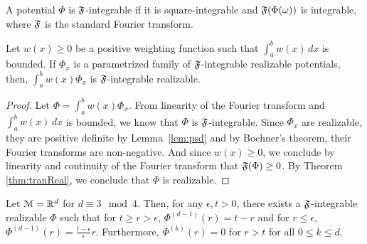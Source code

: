 \begin{definition}
A potential $\Phi$ is ${\mathfrak{F}}$-integrable if it is square-integrable and ${\mathfrak{F}}({\Phi}(\omega))$ is integrable, where ${\mathfrak{F}}$ is the standard Fourier transform.
\end{definition}

\begin{lemma}\label{intReal}
Let $w(x) \geq 0$ be a positive weighting function such that $\int_a^b w(x) \, dx$ is bounded. If $\Phi_x$ is a parametrized family of ${\mathfrak{F}}$-integrable realizable potentials, then, $\int_a^b w(x) \Phi_x$ is ${\mathfrak{F}}$-integrable realizable.
\end{lemma}

\begin{proof}
Let $\Phi = \int_a^b w(x) \Phi_x$. From linearity of the Fourier transform and $\int_a^b w(x)\, dx$ is bounded, we know that $\Phi$ is ${\mathfrak{F}}$-integrable. Since $\Phi_x$ are realizable, they are positive definite by Lemma~\ref{lem:psd} and by Bochner's theorem, their Fourier transforms are non-negative. And since $w(x) \geq 0$, we conclude by linearity and continuity of the Fourier transform that ${\mathfrak{F}}(\Phi) \geq 0$. By Theorem \ref{thm:tranReal}, we conclude that $\Phi$ is realizable.
\end{proof}



\begin{lemma}\label{baseConstruct}
Let $\mathcal{M} = {\mathbb{R}}^d$ for $d \equiv 3 \mod 4$. Then, for any $\epsilon, t > 0$, there exists a ${\mathfrak{F}}$-integrable realizable $\Phi$ such that for $t \geq r > \epsilon$, $\Phi^{(d-1)}(r) = t -r$ and for $ r \leq \epsilon$, $\Phi^{(d-1)}(r) = \frac{t-\epsilon}{\epsilon}r$. Furthermore, $\Phi^{(k)}(r) = 0$ for $r > t$ for all $0 \leq k \leq d$.
\end{lemma}

